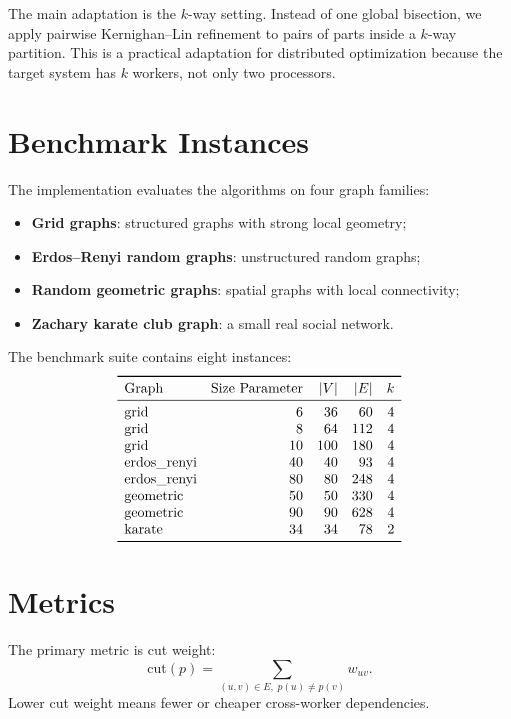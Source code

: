 \documentclass[11pt]{article}
\begin{document}
The main adaptation is the $k$-way setting. Instead of one global bisection, we
apply pairwise Kernighan--Lin refinement to pairs of parts inside a $k$-way
partition. This is a practical adaptation for distributed optimization because
the target system has $k$ workers, not only two processors.

\section{Benchmark Instances}

The implementation evaluates the algorithms on four graph families:
\begin{itemize}
    \item \textbf{Grid graphs}: structured graphs with strong local geometry;
    \item \textbf{Erdos--Renyi random graphs}: unstructured random graphs;
    \item \textbf{Random geometric graphs}: spatial graphs with local
    connectivity;
    \item \textbf{Zachary karate club graph}: a small real social network.
\end{itemize}

The benchmark suite contains eight instances:
\[
\begin{array}{lrrrr}
\toprule
\text{Graph} & \text{Size Parameter} & |V| & |E| & k \\
\midrule
\text{grid} & 6 & 36 & 60 & 4 \\
\text{grid} & 8 & 64 & 112 & 4 \\
\text{grid} & 10 & 100 & 180 & 4 \\
\text{erdos\_renyi} & 40 & 40 & 93 & 4 \\
\text{erdos\_renyi} & 80 & 80 & 248 & 4 \\
\text{geometric} & 50 & 50 & 330 & 4 \\
\text{geometric} & 90 & 90 & 628 & 4 \\
\text{karate} & 34 & 34 & 78 & 2 \\
\bottomrule
\end{array}
\]

\section{Metrics}

The primary metric is cut weight:
\[
    \mathrm{cut}(p)=\sum_{(u,v)\in E,\;p(u)\neq p(v)}w_{uv}.
\]
Lower cut weight means fewer or cheaper cross-worker dependencies.
\end{document}

